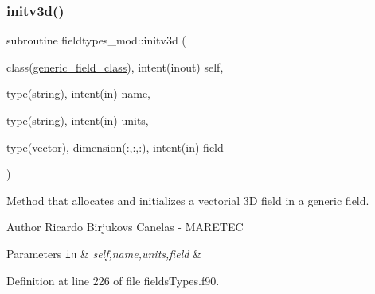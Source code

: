 \subsubsection{\texorpdfstring{initv3d()}{initv3d()}}
{\footnotesize\ttfamily subroutine fieldtypes\+\_\+mod\+::initv3d (\begin{DoxyParamCaption}\item[{class(\mbox{\hyperlink{structfieldtypes__mod_1_1generic__field__class}{generic\+\_\+field\+\_\+class}}), intent(inout)}]{self,  }\item[{type(string), intent(in)}]{name,  }\item[{type(string), intent(in)}]{units,  }\item[{type(vector), dimension(\+:,\+:,\+:), intent(in)}]{field }\end{DoxyParamCaption})\hspace{0.3cm}{\ttfamily [private]}}



Method that allocates and initializes a vectorial 3D field in a generic field. 

\begin{DoxyAuthor}{Author}
Ricardo Birjukovs Canelas -\/ M\+A\+R\+E\+T\+EC 
\end{DoxyAuthor}

\begin{DoxyParams}[1]{Parameters}
\mbox{\tt in}  & {\em self,name,units,field} & \\
\hline
\end{DoxyParams}


Definition at line 226 of file fields\+Types.\+f90.


